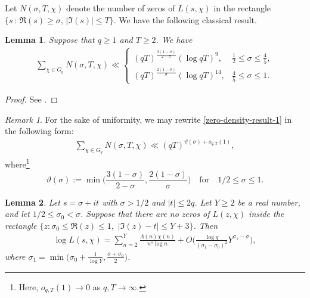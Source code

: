 \documentclass[12pt]{amsart}
\numberwithin{equation}{section}
\theoremstyle{plain}
\newtheorem{lem}{Lemma}
\theoremstyle{remark}
\newtheorem{remark}{Remark}
\theoremstyle{definition}
\theoremstyle{remark}
\begin{document}
Let $N(\sigma,T,\chi)$ denote the number of zeros of $L(s,\chi)$ in the rectangle $\{s\,:\,\Re(s)\geq\sigma,\,|\Im(s)|\leq T\}$. We have the following classical result.
\begin{lem}\label{zero-density-result}
Suppose that $q\geq1$ and $T\geq2$. We have
\begingroup
\renewcommand{\arraystretch}{4}
\begin{equation}\label{zero-density-result-1}
\begin{aligned}
\sum_{\chi\in G_q}N(\sigma,T,\chi)\ll
\begin{cases}
(qT)^{\frac{3(1-\sigma)}{2-\sigma}}(\log qT)^9, & \frac{1}{2} \leq \sigma \leq \frac{4}{5},\\
(qT)^{\frac{2(1-\sigma)}{\sigma}}(\log qT)^{14}, & \frac{4}{5} \leq \sigma \leq 1.
\end{cases}
\end{aligned}
\end{equation}
\endgroup
\end{lem}
\begin{proof}
See \cite[Theorem 12.1]{Montgomery1971}.
\end{proof}
\begin{remark}
For the sake of uniformity, we may rewrite \eqref{zero-density-result-1} in the following form:
\begin{equation}\label{zero-density-result-2}
\begin{aligned}
\sum_{\chi\in G_q}N(\sigma,T,\chi)\ll (qT)^{\vartheta(\sigma)+o_{q,T}(1)},
\end{aligned}
\end{equation}
where\footnote{Here, $o_{q,T}(1)\rightarrow0$ as $q,T\rightarrow\infty$.}
\[
\vartheta(\sigma):=\min\bigg(\frac{3(1-\sigma)}{2-\sigma},\frac{2(1-\sigma)}{\sigma}\bigg)
\quad\text{for}\quad 1/2\leq\sigma\leq1.
\]
\end{remark}

\begin{lem}\label{sound-Truncated}
Let $s=\sigma+it$ with $\sigma>1/2$ and $|t|\leq 2q$. Let $Y\geq2$ be a real number, and let $1/2\leq\sigma_0<\sigma$. Suppose that there are no zeros of $L(z,\chi)$ inside the rectangle $\{z:\sigma_0\leq\Re(z)\leq1,\,\,|\Im(z)-t|\leq Y+3\}$. Then
\begin{equation*}
\begin{aligned}
\log L(s,\chi)=\sum_{n=2}^{Y}\frac{\Lambda(n)\chi(n)}{n^{s}\log n}
+O\Big(\frac{\log q}{(\sigma_1-\sigma_0)^2}Y^{\sigma_1-\sigma}\Big),
\end{aligned}
\end{equation*}
where $\sigma_1=\min\big(\sigma_0+\frac{1}{\log Y},\frac{\sigma+\sigma_0}{2}\big)$.
\end{lem}
\end{document}
